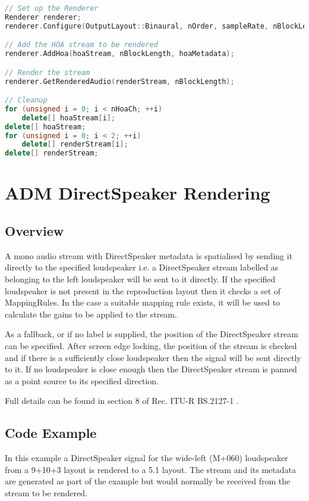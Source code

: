 \documentclass[12pt]{report}
\begin{document}
\begin{lstlisting}[language=C++]
// Set up the Renderer
Renderer renderer;
renderer.Configure(OutputLayout::Binaural, nOrder, sampleRate, nBlockLength, streamInfo);

// Add the HOA stream to be rendered
renderer.AddHoa(hoaStream, nBlockLength, hoaMetadata);

// Render the stream
renderer.GetRenderedAudio(renderStream, nBlockLength);

// Cleanup
for (unsigned i = 0; i < nHoaCh; ++i)
    delete[] hoaStream[i];
delete[] hoaStream;
for (unsigned i = 0; i < 2; ++i)
    delete[] renderStream[i];
delete[] renderStream;
\end{lstlisting}

\section{ADM DirectSpeaker Rendering}\label{AdmDirectSpeaker}

\subsection{Overview}

A mono audio stream with DirectSpeaker metadata is spatialised by sending it directly to the specified loudspeaker i.e. a DirectSpeaker stream labelled as belonging to the left loudspeaker will be sent to it directly.
If the specified loudspeaker is not present in the reproduction layout then it checks a set of MappingRules.
In the case a suitable mapping rule exists, it will be used to calculate the gains to be applied to the stream.

As a fallback, or if no label is supplied, the position of the DirectSpeaker stream can be specified.
After screen edge locking, the position of the stream is checked and if there is a sufficiently close loudspeaker then the signal will be sent directly to it.
If no loudspeaker is close enough then the DirectSpeaker stream is panned as a point source to its specified direction.

Full details can be found in section 8 of Rec. ITU-R BS.2127-1 \cite{ITU2127}.

\subsection{Code Example}

In this example a DirectSpeaker signal for the wide-left (M+060) loudspeaker from a 9+10+3 layout is rendered to a 5.1 layout. The stream and its metadata are generated as part of the example but would normally be received from the stream to be rendered.
\end{document}
